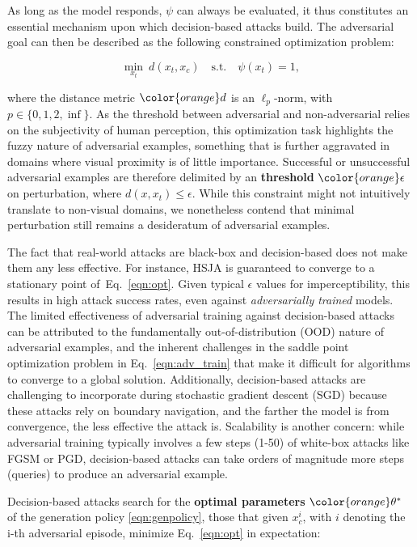 As long as the model responds, $\psi$ can always be evaluated, it thus constitutes an essential mechanism upon which decision-based attacks build.
The adversarial goal can then be described as the following constrained optimization problem:

\begin{equation}
    \operatorname*{min}_{x_t} \: d(x_t,x_c) \quad \text{s.t.} \quad \psi(x_t) = 1,
\label{eqn:opt}
\end{equation}

\noindent where the distance metric $\color{orange}d$ is an $\ell_p$-norm, with $p \in \{0,1,2,\inf\}$.
As the threshold between adversarial and non-adversarial relies on the subjectivity of human perception, this optimization task highlights the fuzzy nature of adversarial examples, something that is further aggravated in domains where visual proximity is of little importance.
Successful or unsuccessful adversarial examples are therefore delimited by an \textbf{threshold} $\color{orange}\epsilon$ on perturbation, where $d(x,x_t) \leq \epsilon$.
While this constraint might not intuitively translate to non-visual domains, we nonetheless contend that minimal perturbation still remains a desideratum of adversarial examples.

The fact that real-world attacks are black-box and decision-based does not make them any less effective.
For instance, HSJA is guaranteed to converge to a stationary point of~Eq.~\eqref{eqn:opt}.
Given typical $\epsilon$ values for imperceptibility, this results in high attack success rates, even against \textit{adversarially trained} models. 
The limited effectiveness of adversarial training against decision-based attacks can be attributed to the fundamentally out-of-distribution (OOD) nature of adversarial examples, and the inherent challenges in the saddle point optimization problem in Eq.~\eqref{eqn:adv_train} that make it difficult for algorithms to converge to a global solution.
Additionally, decision-based attacks are challenging to incorporate during stochastic gradient descent (SGD) because these attacks rely on boundary navigation, and the farther the model is from convergence, the less effective the attack is.
Scalability is another concern: while adversarial training typically involves a few steps (1-50) of white-box attacks like FGSM or PGD, decision-based attacks can take orders of magnitude more steps (queries) to produce an adversarial example.

Decision-based attacks search for the \textbf{optimal parameters} $\color{orange}\theta^*$ of the generation policy \eqref{eqn:genpolicy}, those that given $x^{i}_{c}$, with $i$ denoting the i-th adversarial episode, minimize Eq.~\eqref{eqn:opt} in expectation:

